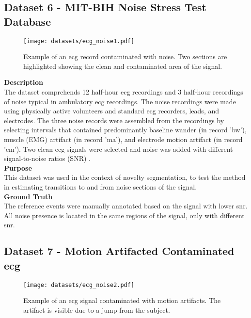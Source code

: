 \subsection{Dataset 6 - MIT-BIH Noise Stress Test Database}
\label{dat:dataset7}

\begin{figure}
\centering
\texttt{[image: datasets/ecg\_noise1.pdf]}
\caption{Example of an \gls{ecg} record contaminated with noise. Two sections are highlighted showing the clean and contaminated area of the signal. \cite{dataset7}}
\label{fig:ecg1_dataset}
\end{figure}

\textbf{Description}\hfill\\
The dataset comprehends 12 half-hour \gls{ecg} recordings and 3 half-hour recordings of noise typical in ambulatory \gls{ecg} recordings. The noise recordings were made using physically active volunteers and standard \gls{ecg} recorders, leads, and electrodes. The three noise records were assembled from the recordings by selecting intervals that contained predominantly baseline wander (in record 'bw'), muscle (EMG) artifact (in record 'ma'), and electrode motion artifact (in record 'em'). Two clean \gls{ecg} signals were selected and noise was added with different signal-to-noise ratios (SNR) \cite{dataset6, PhysioNet}.\\
\textbf{Purpose}\hfill\\
This dataset was used in the context of novelty segmentation, to test the method in estimating transitions to and from noise sections of the signal.\\
\textbf{Ground Truth}\\
The reference events were manually annotated based on the signal with lower \gls{snr}. All noise presence is located in the same regions of the signal, only with different \gls{snr}.

    
\subsection{Dataset 7 - Motion Artifacted Contaminated \gls{ecg}}
\label{dat:dataset8}
\begin{figure}
\centering
\texttt{[image: datasets/ecg\_noise2.pdf]}
\caption{Example of an \gls{ecg} signal contaminated with motion artifacts. The artifact is visible due to a jump from the subject.}
\label{fig:ecg2_dataset}
\end{figure}

